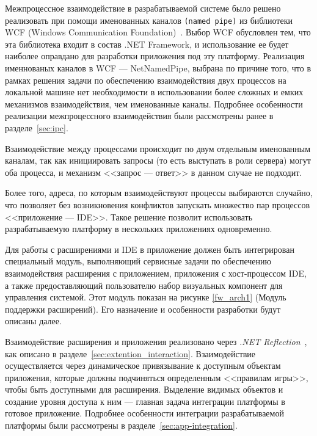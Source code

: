 Межпроцессное взаимодействие в разрабатываемой системе было решено реализовать при помощи именованных каналов {\tt (named pipe)} из библиотеки WCF (Windows Communication Foundation)~\cite{wcf-services}. Выбор WCF обусловлен тем, что эта библиотека входит в состав .NET Framework, и использование ее будет наиболее оправдано для разработки приложения под эту платформу. Реализация именнованых каналов в WCF --- NetNamedPipe, выбрана по причине того, что в рамках решения задачи по обеспечению взаимодействия двух процессов на локальной машине нет необходимости в использовании более сложных и емких механизмов взаимодействия, чем именованные каналы. Подробнее особенности реализации межпроцессного взаимодействия были рассмотрены ранее в разделе~\ref{sec:ipc}.

Взаимодействие между процессами происходит по двум отдельным именованным каналам, так как инициировать запросы (то есть выступать в роли сервера) могут оба процесса, и механизм <<запрос --- ответ>> в данном случае не подходит.

Более того, адреса, по которым взаимодействуют процессы выбираются случайно, что позволяет без возникновения конфликтов запускать множество пар процессов <<приложение --- IDE>>. Такое решение позволит использовать разрабатываемую платформу в нескольких приложениях одновременно.

Для работы с расширениями и IDE в приложение должен быть интегрирован специальный модуль, выполняющий сервисные задачи по обеспечению взаимодействия расширения с приложением, приложения с хост-процессом IDE, а также предоставляющий пользователю набор визуальных компонент для управления системой. Этот модуль показан на рисунке \ref{fw_arch1} (Модуль поддержки расширений). Его назначение и особенности разработки будут описаны далее.

Взаимодействие расширения и приложения реализовано через {\it .NET Reflection}~\cite{cs2008-dotnet35}, как описано в разделе~\ref{sec:extention_interaction}. Взаимодействие осуществляется через динамическое привязывание к доступным объектам приложения, которые должны подчиняться определенным <<правилам игры>>, чтобы быть доступными для расширения. Выделение видимых объектов и создание уровня доступа к ним --- главная задача интеграции платформы в готовое приложение. Подробнее особенности интеграции разрабатываемой платформы были рассмотрены в разделе~\ref{sec:app-integration}.